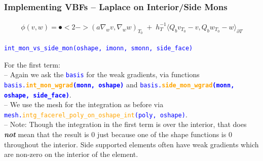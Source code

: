 \documentclass[compress]{beamer}
\begin{document}
\begin{frame}
  \frametitle{Implementing VBFs -- Laplace on Interior/Side Mons}
  \vspace{-1.38cm}
  \begin{align*}
    \mathfrak \phi(v,w) = \spot<2->{(a \nabla_w v,\nabla_w w)_{\scriptscriptstyle T_0}} \;+\;
    h_T^{-1}\langle Q_b v_{\scriptscriptstyle T_0} - v,Q_b w_{\scriptscriptstyle T_0} - w \rangle_{\partial T}
  \end{align*}

  \texttt{\small \textcolor{blue}{int\_mon\_vs\_side\_mon(oshape, imonn, smonn, side\_face)}}\\
  \vspace{.2cm}
  
  \pause
  \uncover<+-> {
  For the first term:\\
  -- Again we ask the \texttt{\textcolor{blue}{basis}} for the weak gradients,
     via functions {\small \texttt{\textcolor{blue}{basis.\textbf{\textcolor{orange}{int\_mon\_wgrad}(monn, oshape)}}}} and
     {\small \texttt{\textcolor{blue}{basis.\textbf{\textcolor{orange}{side\_mon\_wgrad}(monn, oshape, side\_face)}}}}.\\
  -- We use the mesh for the integration as before via
     \texttt{\small \textcolor{blue}{mesh.\textcolor{orange}{intg\_facerel\_poly\_on\_oshape\_int}(poly, oshape)}}.\\
  
  \vspace{.3cm}
  \uncover<+-> {
  -- Note: Though the integration in the first term is over the interior, that does \emph{\textbf{not}} mean that the result
  is 0 just because one of the shape functions is 0 throughout the interior. Side supported elements often have weak gradients
  which are non-zero on the interior of the element.
  }}
\end{frame}
\end{document}
